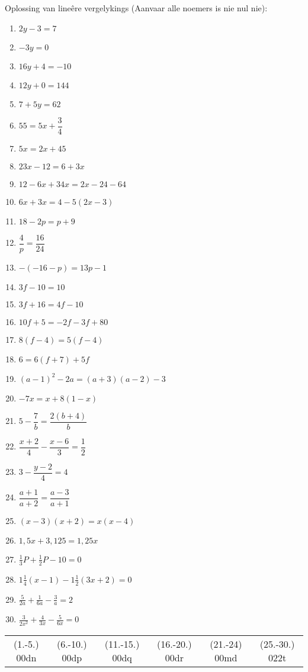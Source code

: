\begin{exercises}{}
{Oplossing van lineêre vergelykings (Aanvaar alle noemers is nie nul nie):

\begin{multicols}{2}
\begin{enumerate}[itemsep=6pt, label=\textbf{\arabic*}. ] 
\item   $2y-3=7$
\item   $-3y=0$        
\item   $16y+4=-10$        
\item   $12y+0=144$
\item   $7+5y=62$       
\item   $55=5x+\dfrac{3}{4}$ 
\item   $5x=2x+45$        
\item   $23x-12=6+3x$
\item   $12-6x+34x=2x-24-64$
\item   $6x+3x=4-5(2x-3)$
\item   $18-2p=p+9$   
\item   $\dfrac{4}{p}=\dfrac{16}{24}$
\item   $-(-16-p)=13p-1$
\item   $3f-10=10$
\item   $3f+16=4f-10$
\item   $10f+5=-2f-3f+80$
\item   $8(f-4)=5(f-4)$
\item  $6=6(f+7)+5f$      
\item $(a-1)^{2} - 2a = (a+3)(a-2) - 3$
\item $-7x = x+8(1-x)$ 
\item $5-\dfrac{7}{b} = \dfrac{2(b+4)}{b}$
\item $\dfrac{x+2}{4} - \dfrac{x-6}{3} = \dfrac{1}{2}$
\item $ 3 - \dfrac{y-2}{4} = 4$
\item $ \dfrac{a+1}{a+2} = \dfrac{a-3}{a+1}$
\item $(x-3)(x+2)=x(x-4)$
\item $1,5x+3,125=1,25x$
\item $\frac{1}{3}P + \frac{1}{2}P - 10 = 0$
\item $1 \frac{1}{4} (x-1)-1\frac{1}{2}(3x+2)=0$
\item $\frac{5}{2a}+\frac{1}{6a}-\frac{3}{a}=2$
\item $\frac{3}{2x^2}+\frac{4}{3x}-\frac{5}{6x}=0$  
\end{enumerate}
\end{multicols}
\practiceinfo
\par 
\par \begin{tabular}[h]{cccccc}
(1.-5.) 00dn&  (6.-10.) 00dp&  (11.-15.) 00dq&  (16.-20.) 00dr& (21.-24) 00md & (25.-30.) 022t & \end{tabular}
}
\end{exercises}


